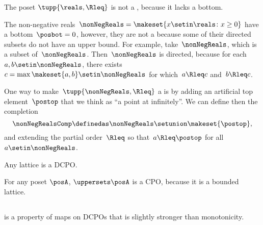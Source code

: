 \begin{example}
    \label{exa:Rcomp}
    The poset $\tupp{\reals, \Rleq}$ is not a \CPO, because it lacks a bottom.

    The non-negative reals~$\nonNegReals=\makeset{x\setin\reals \colon x\geq0}$ have a bottom~$\posbot=0$, however, they are not a \DCPO because some of their directed subsets do not have an upper bound.
    For example, take~$\nonNegReals$, which is a subset of~$\nonNegReals$.
    Then~$\nonNegReals$ is directed, because for each~$a,b\setin\nonNegReals$, there exists~$c=\max\makeset{a,b}\setin\nonNegReals$ for which~$a\Rleq c$ and~$b\Rleq c$.

    One way to make~$\tupp{ \nonNegReals,\Rleq} $ a \CPO is by adding an artificial top element~$\postop$ that we think as ``a point at infinitely''.
    We can define then the completion
    \begin{equation}
        \nonNegRealsComp\definedas\nonNegReals\setunion\makeset{\postop},
    \end{equation} and extending the partial order~$\Rleq$ so that~$a\Rleq\postop$ for all~$a\setin\nonNegReals$.
\end{example}

\begin{example}
    Any lattice is a DCPO.
\end{example}
\begin{example}
    For any poset $\posA$, $\uppersets \posA$ is a CPO, because it is a bounded lattice.
\end{example}

\subsection{\scottcontinuity}

\scottcontinuity is a property of maps on DCPOs that is slightly stronger than monotonicity.

